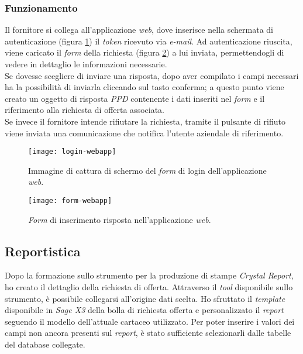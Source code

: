 \newpage
\subsubsection{Funzionamento}
Il fornitore si collega all'applicazione \textit{web}, dove inserisce nella schermata di autenticazione (figura \ref{fig:auth-x3}) il \textit{token} ricevuto via \textit{e-mail}.
Ad autenticazione riuscita, viene caricato il \textit{form} della richiesta (figura \ref{fig:form-x3}) a lui inviata, permettendogli di vedere in dettaglio le informazioni necessarie.\\
Se dovesse scegliere di inviare una risposta, dopo aver compilato i campi necessari ha la possibilità di inviarla cliccando sul tasto conferma; a questo punto viene creato un oggetto di risposta \textit{PPD} contenente i dati inseriti nel \textit{form} e il riferimento alla richiesta di offerta associata.\\
Se invece il fornitore intende rifiutare la richiesta, tramite il pulsante di rifiuto viene inviata una comunicazione che notifica l'utente aziendale di riferimento.

\begin{figure}[htbp]
	\begin{center}
		\texttt{[image: login-webapp]}
		\caption{Immagine di cattura di schermo del \textit{form} di login dell'applicazione \textit{web}.}
		\label{fig:auth-x3}
	\end{center}
\end{figure}

\begin{figure}[htbp]
	\begin{center}
		\texttt{[image: form-webapp]}
		\caption{\textit{Form} di inserimento risposta nell'applicazione \textit{web}.}
		\label{fig:form-x3}
	\end{center}
\end{figure}

\newpage 
\subsection{Reportistica}
Dopo la formazione sullo strumento per la produzione di stampe \textit{Crystal Report}, ho creato il dettaglio della richiesta di offerta.
Attraverso il \textit{tool} disponibile sullo strumento, è possibile collegarsi all'origine dati scelta.
Ho sfruttato il \textit{template} disponibile in \textit{Sage X3} della bolla di richiesta offerta e personalizzato il \textit{report} seguendo il modello dell'attuale cartaceo utilizzato.
Per poter inserire i valori dei campi non ancora presenti sul \textit{report}, è stato sufficiente selezionarli dalle tabelle del database collegate.

